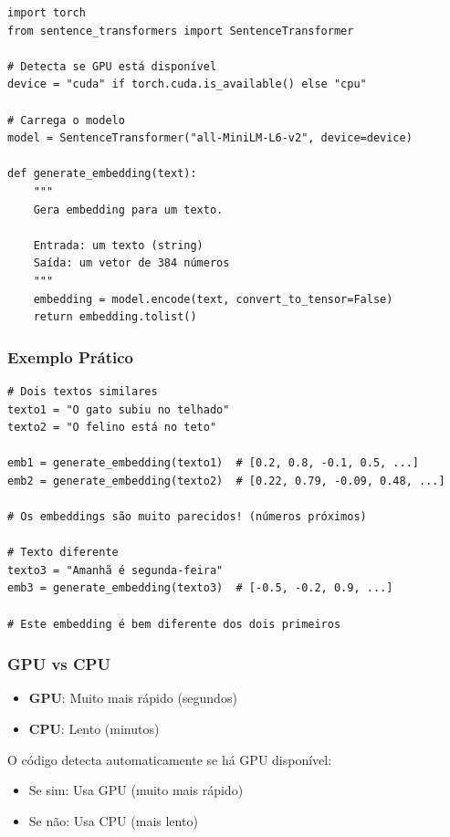 \documentclass[12pt,a4paper]{article}
\begin{document}
\begin{lstlisting}
import torch
from sentence_transformers import SentenceTransformer

# Detecta se GPU está disponível
device = "cuda" if torch.cuda.is_available() else "cpu"

# Carrega o modelo
model = SentenceTransformer("all-MiniLM-L6-v2", device=device)

def generate_embedding(text):
    """
    Gera embedding para um texto.
    
    Entrada: um texto (string)
    Saída: um vetor de 384 números
    """
    embedding = model.encode(text, convert_to_tensor=False)
    return embedding.tolist()
\end{lstlisting}

\subsubsection{Exemplo Prático}

\begin{lstlisting}
# Dois textos similares
texto1 = "O gato subiu no telhado"
texto2 = "O felino está no teto"

emb1 = generate_embedding(texto1)  # [0.2, 0.8, -0.1, 0.5, ...]
emb2 = generate_embedding(texto2)  # [0.22, 0.79, -0.09, 0.48, ...]

# Os embeddings são muito parecidos! (números próximos)

# Texto diferente
texto3 = "Amanhã é segunda-feira"
emb3 = generate_embedding(texto3)  # [-0.5, -0.2, 0.9, ...]

# Este embedding é bem diferente dos dois primeiros
\end{lstlisting}

\subsubsection{GPU vs CPU}

\begin{itemize}
    \item \textbf{GPU}: Muito mais rápido (segundos)
    \item \textbf{CPU}: Lento (minutos)
\end{itemize}

O código detecta automaticamente se há GPU disponível:
\begin{itemize}
    \item Se sim: Usa GPU (muito mais rápido)
    \item Se não: Usa CPU (mais lento)
\end{itemize}
\end{document}
